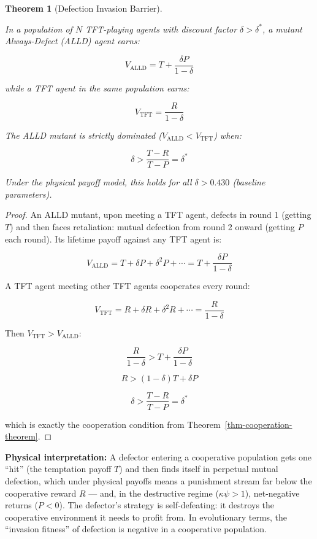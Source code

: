 \documentclass[11pt]{article}
\theoremstyle{plain}
\newtheorem{theorem}{Theorem}
\theoremstyle{definition}
\theoremstyle{remark}
\begin{document}
\begin{theorem}[Defection Invasion Barrier]
\label{thm-defection-invasion-barrier}

In a population of $N$ TFT-playing agents with discount factor $\delta > \delta^*$, a mutant Always-Defect (ALLD) agent earns:

$$V_{\text{ALLD}} = T + \frac{\delta P}{1 - \delta}$$

while a TFT agent in the same population earns:

$$V_{\text{TFT}} = \frac{R}{1 - \delta}$$

The ALLD mutant is strictly dominated ($V_{\text{ALLD}} < V_{\text{TFT}}$) when:

$$\delta > \frac{T - R}{T - P} = \delta^*$$

Under the physical payoff model, this holds for all $\delta > 0.430$ (baseline parameters).
\end{theorem}

\begin{proof}
An ALLD mutant, upon meeting a TFT agent, defects in round 1 (getting $T$) and then faces retaliation: mutual defection from round 2 onward (getting $P$ each round). Its lifetime payoff against any TFT agent is:

$$V_{\text{ALLD}} = T + \delta P + \delta^2 P + \cdots = T + \frac{\delta P}{1 - \delta}$$

A TFT agent meeting other TFT agents cooperates every round:

$$V_{\text{TFT}} = R + \delta R + \delta^2 R + \cdots = \frac{R}{1 - \delta}$$

Then $V_{\text{TFT}} > V_{\text{ALLD}}$:

$$\frac{R}{1 - \delta} > T + \frac{\delta P}{1 - \delta}$$

$$R > (1 - \delta)T + \delta P$$

$$\delta > \frac{T - R}{T - P} = \delta^*$$

which is exactly the cooperation condition from Theorem~\ref{thm-cooperation-theorem}.
\end{proof}

\textbf{Physical interpretation:} A defector entering a cooperative
population gets one ``hit'' (the temptation payoff \(T\)) and then finds
itself in perpetual mutual defection, which under physical payoffs means
a punishment stream far below the cooperative reward \(R\) --- and, in
the destructive regime (\(\kappa\psi > 1\)), net-negative returns
(\(P < 0\)). The defector's strategy is self-defeating: it destroys the
cooperative environment it needs to profit from. In evolutionary terms,
the ``invasion fitness'' of defection is negative in a cooperative
population.
\end{document}
